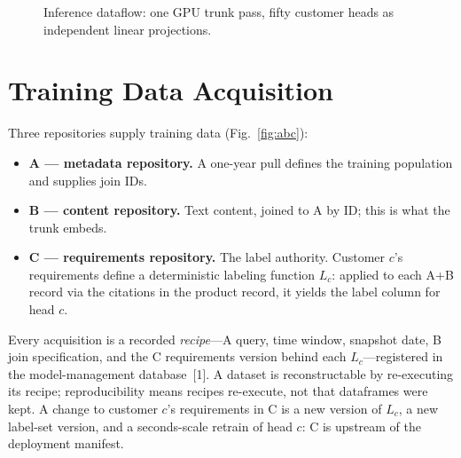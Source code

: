 \documentclass[conference]{IEEEtran}
\begin{document}
\begin{figure}[t]
\centering
{}
\caption{Inference dataflow: one GPU trunk pass, fifty customer heads as independent linear projections.}
\label{fig:arch}
\end{figure}

\section{Training Data Acquisition}
\label{sec:abc}
Three repositories supply training data (Fig.~\ref{fig:abc}):
\begin{itemize}
\item \textbf{A --- metadata repository.} A one-year pull defines the training population and supplies join IDs.
\item \textbf{B --- content repository.} Text content, joined to A by ID; this is what the trunk embeds.
\item \textbf{C --- requirements repository.} The label authority. Customer $c$'s requirements define a deterministic labeling function $L_c$: applied to each A+B record via the citations in the product record, it yields the label column for head $c$.
\end{itemize}
Every acquisition is a recorded \emph{recipe}---A query, time window, snapshot date, B join specification, and the C requirements version behind each $L_c$---registered in the model-management database~[1]. A dataset is reconstructable by re-executing its recipe; reproducibility means recipes re-execute, not that dataframes were kept. A change to customer $c$'s requirements in C is a new version of $L_c$, a new label-set version, and a seconds-scale retrain of head $c$: C is upstream of the deployment manifest.
\end{document}
